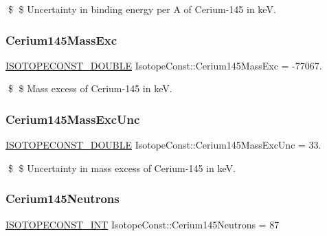 \$ \$ Uncertainty in binding energy per A of Cerium-\/145 in keV. \mbox{\label{group___isotope_const-_cerium-_ce145_ga8714c7377c20f551abe8a40ae04f0e50}} 
\subsubsection{\texorpdfstring{Cerium145\+Mass\+Exc}{Cerium145MassExc}}
{\footnotesize\ttfamily \mbox{\hyperlink{group___isotope_const-_macros_ga8f45a7272ce02c0b4c65c44636ed719a}{I\+S\+O\+T\+O\+P\+E\+C\+O\+N\+S\+T\+\_\+\+D\+O\+U\+B\+LE}} Isotope\+Const\+::\+Cerium145\+Mass\+Exc = -\/77067.}

\$ \$ Mass excess of Cerium-\/145 in keV. \mbox{\label{group___isotope_const-_cerium-_ce145_ga225359418eb60395ea2bd90ccbb313f0}} 
\subsubsection{\texorpdfstring{Cerium145\+Mass\+Exc\+Unc}{Cerium145MassExcUnc}}
{\footnotesize\ttfamily \mbox{\hyperlink{group___isotope_const-_macros_ga8f45a7272ce02c0b4c65c44636ed719a}{I\+S\+O\+T\+O\+P\+E\+C\+O\+N\+S\+T\+\_\+\+D\+O\+U\+B\+LE}} Isotope\+Const\+::\+Cerium145\+Mass\+Exc\+Unc = 33.}

\$ \$ Uncertainty in mass excess of Cerium-\/145 in keV. \mbox{\label{group___isotope_const-_cerium-_ce145_gae87acf7995d4d216305d304b7efa4476}} 
\subsubsection{\texorpdfstring{Cerium145\+Neutrons}{Cerium145Neutrons}}
{\footnotesize\ttfamily \mbox{\hyperlink{group___isotope_const-_macros_ga5f18360b3e99483a35c32d789e62621c}{I\+S\+O\+T\+O\+P\+E\+C\+O\+N\+S\+T\+\_\+\+I\+NT}} Isotope\+Const\+::\+Cerium145\+Neutrons = 87}

